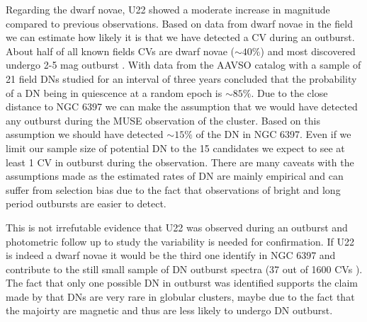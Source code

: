  Regarding the dwarf novae, U22 showed a moderate increase in magnitude compared to previous observations. Based on data from dwarf novae in the field we can estimate how likely it is that we have detected a CV during an outburst. About half of all known fields CVs are dwarf novae ($\sim 40 \%$) and most discovered undergo 2-5 mag outburst \citep{2001PASP..113..764D,warner_cataclysmic_2003}. With data from the AAVSO catalog with a sample of 21 field DNs studied for an interval of three years \cite{Szkody_21DN_1984} concluded that the probability of a DN being in quiescence at a random epoch is $\sim 85 \%$. Due to the close distance to NGC 6397 we can make the assumption that we would have detected any outburst during the MUSE observation of the cluster. Based on this assumption we should have detected $\sim 15 \%$ of the DN in NGC 6397. Even if we limit our sample size of potential DN to the 15 candidates we expect to see at least 1 CV in outburst during the observation. There are many caveats with the assumptions made as the estimated rates of DN are mainly empirical and can suffer from selection bias due to the fact that observations of bright and long period outbursts are easier to detect. 

This is not irrefutable evidence that U22 was observed during an outburst and photometric follow up to study the variability is needed for confirmation. If U22 is indeed a dwarf novae it would be the third one identify in NGC 6397 \citep{shara_erupting_2005} and contribute to the still small sample of DN outburst spectra (37 out of 1600 CVs \citep{2001PASP..113..764D}). The fact that only one possible DN in outburst was identified supports the claim made by \cite{shara_CVsDN_1996} that DNs are very rare in globular clusters, maybe due to the fact that the majoirty are magnetic and thus are less likely to undergo DN outburst. \\ 

\begin{comment}

When U10 was first identity the X ray data suggested some magetism but we dont see any evidence in the specta. Tere

The X-ray spectral results suggest nine CVs, all with mod-
erately hard TB spectra and internal self-absorption. The in-
trinsic
N
H
, particularly for U10 (CV6), suggests that these sys-
tems may be dominated by magnetic C



variablity 

Discussion:

    Two population:
        Dynamically vs. primordial?
    Magnetism ?
    X-Ray ?


\end{comment}
